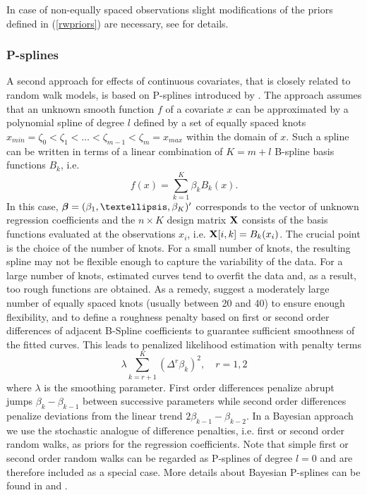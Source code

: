 \documentclass[11pt,a4paper,twoside]{bayesxarticle}
\begin{document}
In case of non-equally spaced observations slight modifications of the priors defined in (\ref{rwpriors}) are necessary, see
 for details.

\subsubsection{P-splines}

A second approach for effects of continuous covariates, that is closely related to random walk models, is based on P-splines
introduced by . The approach assumes that an unknown smooth function $f$ of a covariate $x$ can be
approximated by a polynomial spline of degree $l$ defined by a set of equally spaced knots $x_{min} = \zeta_{0}  < \zeta_{1} <
\dots < \zeta_{m-1} < \zeta_{m} = x_{max}$ within the domain of $x$. Such a spline can be written in terms of a linear
combination of $K = m+l$ B-spline basis functions $B_{k}$, i.e.
$$
f(x) = \sum_{k=1}^{K} \beta_{k} B_{k}(x).
$$
In this case, $\betavec = (\beta_{1},\dots,\beta_{K})'$ corresponds to the vector of unknown regression coefficients and the $n
\times K$ design matrix $\mathbf{X}$ consists of the basis functions evaluated at the observations $x_{i}$, i.e. $\mathbf{X}[i,k] =
B_k(x_{i})$. The crucial point is the choice of the number of knots. For a small number of knots, the resulting spline may not
be flexible enough to capture the variability of the data. For a large number of knots, estimated curves tend to overfit the
data and, as a result, too rough functions are obtained. As a remedy,  suggest a moderately large number
of equally spaced knots (usually between 20 and 40) to ensure enough flexibility, and to define a roughness penalty based on
first or second order differences of adjacent B-Spline coefficients to guarantee sufficient smoothness of the fitted curves.
This leads to penalized likelihood estimation with penalty terms
\begin{equation}
\label{diffpenalty} \lambda \sum_{k=r+1}^{K}
(\Delta^r \beta_{k})^2 , \quad r=1,2
\end{equation}
where $\lambda$ is the smoothing parameter. First order differences penalize abrupt jumps $\beta_{k}-\beta_{k-1}$ between
successive parameters while second order differences penalize deviations from the linear trend $2 \beta_{k-1}-\beta_{k-2}$. In
a Bayesian approach we use the stochastic analogue of difference penalties, i.e. first or second order random walks, as priors
for the regression coefficients. Note that simple first or second order random walks can be regarded as P-splines of degree
$l=0$ and are therefore included as a special case. More details about Bayesian P-splines can be found in 
and .
\end{document}
